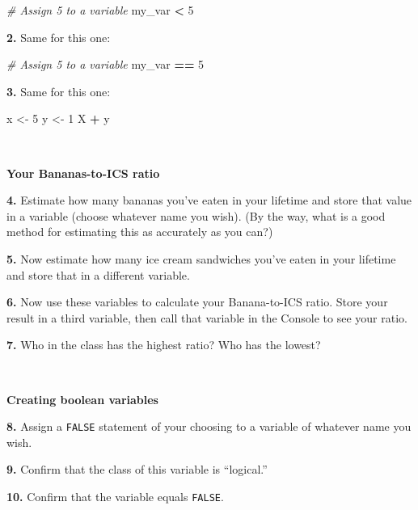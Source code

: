 \documentclass[]{book}
\newenvironment{Shaded}{\begin{snugshade}}{\end{snugshade}}
\newcommand{\CommentTok}[1]{\textcolor[rgb]{0.56,0.35,0.01}{\textit{#1}}}
\newcommand{\DecValTok}[1]{\textcolor[rgb]{0.00,0.00,0.81}{#1}}
\newcommand{\NormalTok}[1]{#1}
\newcommand{\OperatorTok}[1]{\textcolor[rgb]{0.81,0.36,0.00}{\textbf{#1}}}
\newcommand{\StringTok}[1]{\textcolor[rgb]{0.31,0.60,0.02}{#1}}
\begin{document}
\begin{Shaded}
\begin{Highlighting}[]
\CommentTok{# Assign 5 to a variable}
\NormalTok{my_var }\OperatorTok{<}\StringTok{ }\DecValTok{5}
\end{Highlighting}
\end{Shaded}

\textbf{2.} Same for this one:

\begin{Shaded}
\begin{Highlighting}[]
\CommentTok{# Assign 5 to a variable}
\NormalTok{my_var }\OperatorTok{==}\StringTok{ }\DecValTok{5}
\end{Highlighting}
\end{Shaded}

\textbf{3.} Same for this one:

\begin{Shaded}
\begin{Highlighting}[]
\NormalTok{x <-}\StringTok{ }\DecValTok{5}
\NormalTok{y <-}\StringTok{ }\DecValTok{1}
\NormalTok{X }\OperatorTok{+}\StringTok{ }\NormalTok{y}
\end{Highlighting}
\end{Shaded}

~

\textbf{Your Bananas-to-ICS ratio}

\textbf{4.} Estimate how many bananas you've eaten in your lifetime and store that value in a variable (choose whatever name you wish). (By the way, what is a good method for estimating this as accurately as you can?)

\textbf{5.} Now estimate how many ice cream sandwiches you've eaten in your lifetime and store that in a different variable.

\textbf{6.} Now use these variables to calculate your Banana-to-ICS ratio. Store your result in a third variable, then call that variable in the Console to see your ratio.

\textbf{7.} Who in the class has the highest ratio? Who has the lowest?

~

\textbf{Creating boolean variables}

\textbf{8.} Assign a \texttt{FALSE} statement of your choosing to a variable of whatever name you wish.

\textbf{9.} Confirm that the class of this variable is ``logical.''

\textbf{10.} Confirm that the variable equals \texttt{FALSE}.
\end{document}
